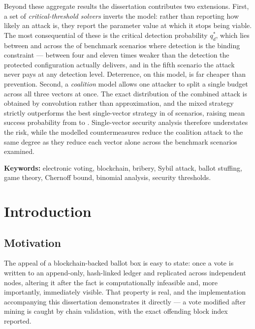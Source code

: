 \documentclass[11pt,a4paper]{article}
\begin{document}
Beyond these aggregate results the dissertation contributes two extensions. First, a
set of \emph{critical-threshold solvers} inverts the model: rather than reporting how
likely an attack is, they report the parameter value at which it stops being viable.
The most consequential of these is the critical detection probability $q_d^*$, which
lies between \CriticalDetectionMin{} and \CriticalDetectionMax{} across the
\CriticalDetectionBindingCount{} of \CoalitionScenarioCount{} benchmark scenarios where
detection is the binding constraint --- between four and eleven times weaker than the
detection the protected configuration actually delivers, and in the fifth scenario the
attack never pays at any detection level. Deterrence, on this model,
is far cheaper than prevention. Second, a \emph{coalition} model allows one attacker
to split a single budget across all three vectors at once. The exact distribution of
the combined attack is obtained by convolution rather than approximation, and the
mixed strategy strictly outperforms the best single-vector strategy in
\CoalitionBetterCount{} of \CoalitionScenarioCount{} scenarios, raising mean success
probability from \BestPureMeanBaseline{} to \CoalitionMeanBaseline{}. Single-vector
security analysis therefore understates the risk, while the modelled countermeasures
reduce the coalition attack to the same degree as they reduce each vector alone across
the benchmark scenarios examined.

\vspace{0.6em}
\noindent\textbf{Keywords:} electronic voting, blockchain, bribery, Sybil attack,
ballot stuffing, game theory, Chernoff bound, binomial analysis, security thresholds.

\clearpage
\tableofcontents
\clearpage
\listoffigures
\listoftables
\clearpage

\section{Introduction}

\subsection{Motivation}

The appeal of a blockchain-backed ballot box is easy to state: once a vote is written
to an append-only, hash-linked ledger and replicated across independent nodes, altering
it after the fact is computationally infeasible and, more importantly, immediately
visible. That property is real, and the implementation accompanying this dissertation
demonstrates it directly --- a vote modified after mining is caught by chain validation,
with the exact offending block index reported.
\end{document}
